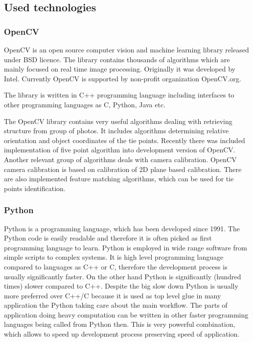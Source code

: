 \documentclass[a4paper,12pt]{article}
\begin{document}
\subsection{Used technologies}

\subsubsection{OpenCV}


OpenCV is an open source computer vision and machine learning library released under BSD licence.
The library contains thousands of algorithms which are mainly focused on real time image processing.
Originally it was developed by Intel. Currently OpenCV is supported by non-profit organization OpenCV.org.

The library is written in C++ programming language including interfaces to other programming languages as C, Python, Java etc. 

The OpenCV library contains very useful algorithms dealing with retrieving structure from group 
of photos. It includes algorithms determining relative orientation 
and object coordinates of the tie points.
Recently there was included implementation of five point algorithm into development version of OpenCV.
Another relevant group of algorithms deals with camera calibration. OpenCV  camera calibration
is based on calibration of 2D plane based calibration.  
There are also implemented feature matching algorithms, which can be used for tie points identification. 


\subsubsection{Python}

Python is a programming language, which has been developed since 1991. 
The Python code is easily readable and therefore it is often picked as first programming
language to learn. Python is employed in wide range software from simple scripts to complex systems.
It is high level programming language compared to languages as C++ or C, therefore 
the development process is usually significantly faster. On the other hand 
Python is significantly (hundred times) slower compared to C++. Despite the big 
slow down Python is usually more preferred over C++/C because 
it is used as top level glue in many application the Python taking care about 
the main workflow. The parts of application doing heavy computation can 
be written in other faster programming languages being called 
from Python then. This is very powerful combination, which allows to speed up development 
process preserving speed of application.
\end{document}
